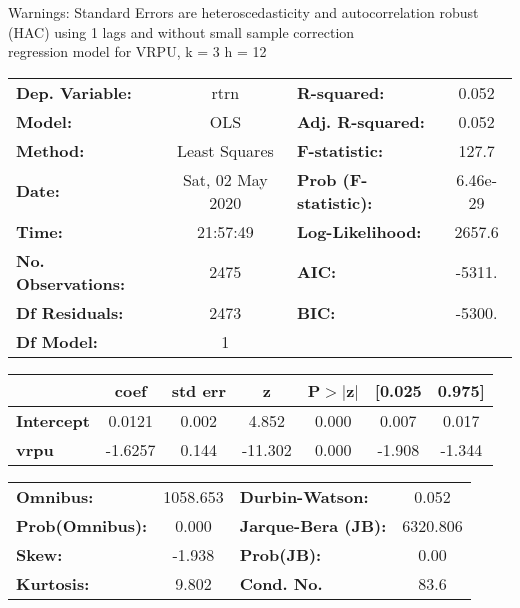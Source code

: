 Warnings: \newline
 [1] Standard Errors are heteroscedasticity and autocorrelation robust (HAC) using 1 lags and without small sample correction\\ 

regression model for VRPU, k = 3 h = 12\begin{center}
\begin{tabular}{lclc}
\toprule
\textbf{Dep. Variable:}    &       rtrn       & \textbf{  R-squared:         } &     0.052   \\
\textbf{Model:}            &       OLS        & \textbf{  Adj. R-squared:    } &     0.052   \\
\textbf{Method:}           &  Least Squares   & \textbf{  F-statistic:       } &     127.7   \\
\textbf{Date:}             & Sat, 02 May 2020 & \textbf{  Prob (F-statistic):} &  6.46e-29   \\
\textbf{Time:}             &     21:57:49     & \textbf{  Log-Likelihood:    } &    2657.6   \\
\textbf{No. Observations:} &        2475      & \textbf{  AIC:               } &    -5311.   \\
\textbf{Df Residuals:}     &        2473      & \textbf{  BIC:               } &    -5300.   \\
\textbf{Df Model:}         &           1      & \textbf{                     } &             \\
\bottomrule
\end{tabular}
\begin{tabular}{lcccccc}
                   & \textbf{coef} & \textbf{std err} & \textbf{z} & \textbf{P$> |$z$|$} & \textbf{[0.025} & \textbf{0.975]}  \\
\midrule
\textbf{Intercept} &       0.0121  &        0.002     &     4.852  &         0.000        &        0.007    &        0.017     \\
\textbf{vrpu}      &      -1.6257  &        0.144     &   -11.302  &         0.000        &       -1.908    &       -1.344     \\
\bottomrule
\end{tabular}
\begin{tabular}{lclc}
\textbf{Omnibus:}       & 1058.653 & \textbf{  Durbin-Watson:     } &    0.052  \\
\textbf{Prob(Omnibus):} &   0.000  & \textbf{  Jarque-Bera (JB):  } & 6320.806  \\
\textbf{Skew:}          &  -1.938  & \textbf{  Prob(JB):          } &     0.00  \\
\textbf{Kurtosis:}      &   9.802  & \textbf{  Cond. No.          } &     83.6  \\
\bottomrule
\end{tabular}
\end{center}

